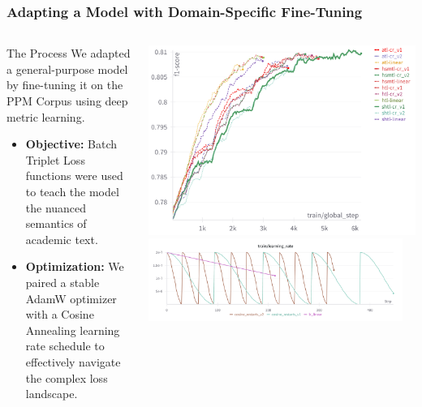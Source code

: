 \documentclass[aspectratio=169,10pt]{beamer}
\begin{document}
\begin{frame}
    \frametitle{Adapting a Model with Domain-Specific Fine-Tuning}
    
    \begin{columns}[T]
        \begin{column}{0.4\textwidth}
            \hfill\vspace{2mm}
            \begin{block}{The Process}
                We adapted a general-purpose model by fine-tuning it on the PPM Corpus using deep metric learning.
                \begin{itemize}
                    \item \textbf{Objective:} Batch Triplet Loss functions were used to teach the model the nuanced semantics of academic text.
                    \item \textbf{Optimization:} We paired a stable AdamW optimizer with a Cosine Annealing learning rate schedule to effectively navigate the complex loss landscape.
                \end{itemize}
            \end{block}
        \end{column}

        \begin{column}{0.45\textwidth}
            \centering
            \includegraphics[width=\textwidth]{fine-tune_validation_f1_vs_step.png}
            \vspace{2cm}
            \includegraphics[width=0.95\textwidth]{learning rate.png}
            

\end{column}
\end{columns}
\end{frame}
\end{document}
